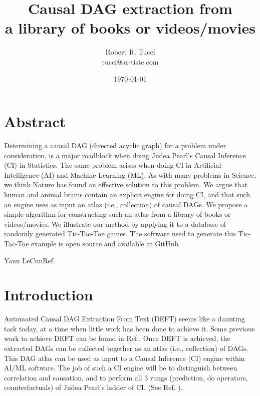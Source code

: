 \documentclass[12pt]{article}
\begin{document}
\title{Causal DAG extraction from \\
a library of books or videos/movies}
\date{ \today}
\author{Robert R. Tucci\\
        tucci@ar-tiste.com}
\maketitle
\vskip2cm
\section*{Abstract}
Determining a causal DAG (directed acyclic graph) for a problem under
consideration,
is a major roadblock when doing Judea Pearl's
Causal Inference (CI) in Statistics. The same problem arises when doing
CI in Artificial Intelligence (AI) and Machine Learning (ML).
As with many problems in Science,
we think Nature has found an effective solution to 
 this problem.
We argue that human and animal
brains 
contain an explicit 
engine for doing CI,
and that such an engine
uses as input an atlas (i.e., collection)
of causal DAGs.
We propose a simple 
algorithm for constructing 
such an atlas 
from a library of books or videos/movies.
We illustrate our method by applying it
to a database of randomly generated 
Tic-Tac-Toe games. The software used to 
generate this Tic-Tac-Toe example is open source and
available at GitHub.
\newpage


{Yann LeCun}{Ref.\cite{yann-text}}


\section{Introduction}
Automated Causal  DAG Extraction From Text (DEFT)
seems like a daunting task today,
at a time when little work has been 
done to achieve it. 
Some previous work to achieve DEFT can be 
found in Ref.\cite{2022opberg, waltz}. Once  DEFT is achieved,
the extracted DAGs can be 
collected together as an atlas (i.e., collection) of DAGs. This DAG atlas can be used 
as input to a
Causal Inference (CI) engine
within AI/ML software.
The job of such a CI engine 
will be to
distinguish between
correlation and causation,
and to
perform all 3 rungs (prediction,
do operators, counterfactuals)
of Judea Pearl's ladder of CI. (See Ref.
\cite{book-of-why}).
\end{document}
